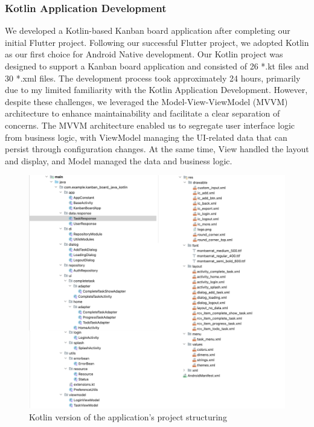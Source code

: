 \subsubsection{Kotlin Application Development} 
We developed a Kotlin-based Kanban board application after completing our initial Flutter project. Following our successful Flutter project, we adopted Kotlin as our first choice for Android Native development. Our Kotlin project was designed to support a Kanban board application and consisted of 26 *.kt files and 30 *.xml files. The development process took approximately 24 hours, primarily due to my limited familiarity with the Kotlin Application Development.
However, despite these challenges, we leveraged the Model-View-ViewModel (MVVM) architecture to enhance maintainability and facilitate a clear separation of concerns. The MVVM \cite{Sewak_2023} architecture enabled us to segregate user interface logic from business logic, with ViewModel managing the UI-related data that can persist through configuration changes. At the same time, View handled the layout and display, and Model managed the data and business logic.
\begin{figure}[htbp]
    \centering
    \includegraphics[scale = 0.8]{img/kotlin_project_struct.png}
    \caption{Kotlin version of the application’s project structuring}
    \label{fig:kotlin_project_struct}
\end{figure}
\par
